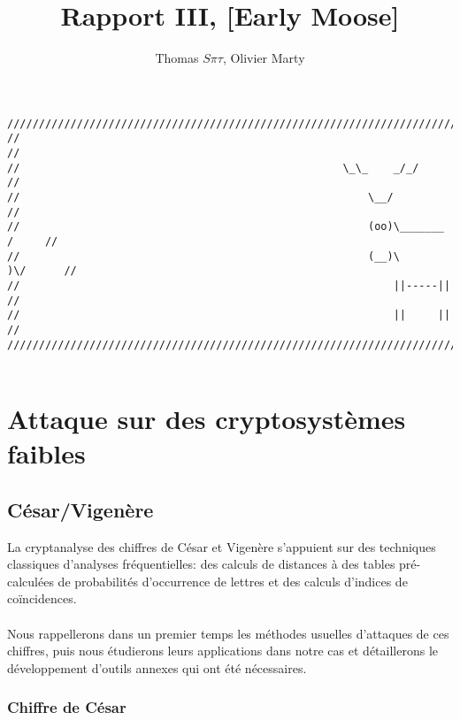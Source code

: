\documentclass[11pt]{article} %
\title{Rapport III,  [Early Moose]}
\author{Thomas $S\pi\tau$, Olivier Marty}
\begin{document}
\maketitle

\begin{verbatim}
////////////////////////////////////////////////////////////////////////////////
//                                                                            //
//                                                   \_\_    _/_/             //
//                                                       \__/                 //
//                                                       (oo)\_______   /     //
//                                                       (__)\       )\/      //
//                                                           ||-----||        //
//                                                           ||     ||        //
////////////////////////////////////////////////////////////////////////////////  


\end{verbatim}

\section{Attaque sur des cryptosystèmes faibles}

\subsection{César/Vigenère}


 La cryptanalyse des chiffres de César et Vigenère s'appuient sur des techniques classiques d'analyses
fréquentielles: des calculs de distances à des tables pré-calculées de probabilités d'occurrence de lettres et des calculs d'indices de coïncidences.\\\\
    Nous rappellerons dans un premier temps les méthodes usuelles d'attaques de ces chiffres, puis nous étudierons leurs applications dans notre cas et détaillerons le développement d'outils annexes qui ont été nécessaires.

\subsubsection{Chiffre de César}
\end{document}
